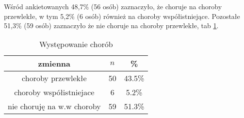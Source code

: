 Wśród ankietowanych 48,7\% (56 osób) zaznaczyło, że choruje na choroby przewlekłe, w tym 5,2\% (6 osób) również na choroby współistniejące. Pozostałe 51,3\% (59 osób) zaznaczyło że nie choruje na choroby przewlekłe, tab \ref{tab:Q33}.

\begin{table}[H]
\caption{Występowanie chorób}
\centering
\begin{tabular}{ | c | c | c |}
\hline
zmienna & $n$ & \% \\
\hline
choroby przewlekłe  &  50  & 43.5\% \\
\hline
choroby współistniejace  &  6  & 5.2\% \\
\hline
nie choruję na w.w choroby  &  59  & 51.3\% \\
\hline
\end{tabular}
\label{tab:Q33}
\end{table}
